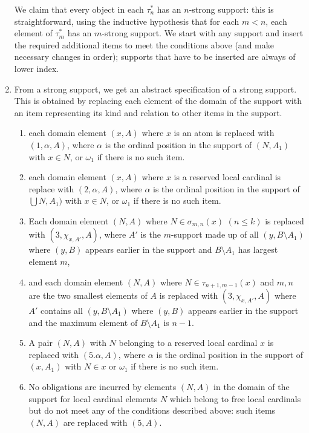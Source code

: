 \documentclass[12pt]{article}
\begin{document}
\begin{enumerate}
We claim that every object in each $\tau^*_n$ has an $n$-strong support:  this is straightforward, using the inductive hypothesis that for each $m<n$, each element of $\tau^*_m$ has
an $m$-strong support.  We start with any support and insert the required additional items to meet the conditions above (and make necessary changes in order);  supports that have to be inserted are always of lower index.

\item  From a strong support, we get an abstract specification of a strong support.  This is obtained by replacing each element of the domain of the support with an item representing
its kind and relation to other items in the support.

\begin{enumerate}

\item each domain element $(x,A)$ where $x$ is an atom  is replaced with $(1,\alpha,A)$, where $\alpha$ is the ordinal position in the support of $(N,A_1)$ with
$x \in N$, or $\omega_1$ if there is no such item.

\item  each domain element $(x,A)$ where $x$ is a reserved local cardinal is replace with $(2,\alpha,A)$, where $\alpha$ is the ordinal position in the support of $\bigcup N,A_1)$ with
$x \in N$, or $\omega_1$ if there is no such item.

\item Each domain element $(N,A)$ where $N \in \sigma_{m,n}(x)$ $(n \leq k)$ is replaced with $(3,\chi_{x,A'},A)$, where $A'$ is the $m$-support made up of all $(y,B\setminus A_1)$ where $(y,B)$ appears earlier in the support and $B \setminus A_1$ has largest element $m$,

\item and each domain element $(N,A)$ where $N \in \tau_{n+1,m-1}(x)$ and $m,n$ are the two smallest elements of $A$ is replaced with $(3,\chi_{x,A'},A)$ where $A'$ contains all $(y,B \setminus A_1)$ where $(y,B)$ appears earlier in the support and the maximum element of $B \setminus A_1$ is $n-1$.

\item A pair $(N,A)$ with $N$ belonging to a reserved local cardinal $x$ is replaced with $(5.\alpha,A)$, where $\alpha$ is the ordinal position in the support of $(x,A_1)$ with $N \in x$ or $\omega_1$ if there is no such item.

\item No obligations are incurred by elements $(N,A)$ in the domain of the support for local cardinal elements $N$ which belong to free local cardinals  but do not meet any of the conditions described above:  such items $(N,A)$ are replaced with $(5,A)$.



\end{enumerate}
\end{enumerate}
\end{document}
